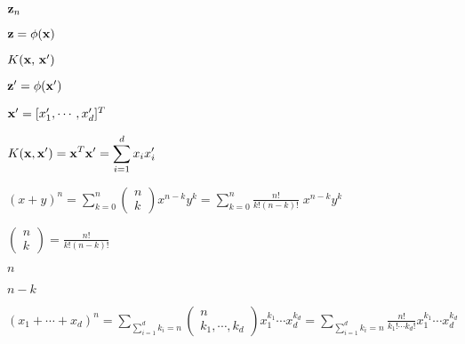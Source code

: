 \documentclass{article}
\def\lthtmlcheckvsize{\ifdim\ht\sizebox<\vsize 
  \ifdim\wd\sizebox<\hsize\expandafter\hfill\fi \expandafter\vfill
  \else\expandafter\vss\fi}%
\begin{document}
{\newpage\clearpage
{}%
$ {\bf z}_n$%
\lthtmlindisplaymathZ
\lthtmlcheckvsize\clearpage}

{\newpage\clearpage
{}%
$ {\bf z}=\phi({\bf x})$%
\lthtmlindisplaymathZ
\lthtmlcheckvsize\clearpage}

{\newpage\clearpage
{}%
$ K({\bf x},\,{\bf x}')$%
\lthtmlindisplaymathZ
\lthtmlcheckvsize\clearpage}

{\newpage\clearpage
{}%
$ {\bf z}'=\phi({\bf x}')$%
\lthtmlindisplaymathZ
\lthtmlcheckvsize\clearpage}

{\newpage\clearpage
{}%
$ {\bf x}'=[x'_1,\cdots,x'_d]^T$%
\lthtmlindisplaymathZ
\lthtmlcheckvsize\clearpage}

{\newpage\clearpage
{}%
$\displaystyle K({\bf x},{\bf x}')={\bf x}^T {\bf x}'=\sum_{i=1}^d x_ix'_i$%
\lthtmlindisplaymathZ
\lthtmlcheckvsize\clearpage}

{\newpage\clearpage
{}%
$\displaystyle (x+y)^n=\sum_{k=0}^n\left(\begin{array}{c}n\\k\end{array}\right) x^{n-k} y^k
=\sum_{k=0}^n \frac{n!}{k!(n-k)!}\; x^{n-k} y^k$%
\lthtmlindisplaymathZ
\lthtmlcheckvsize\clearpage}

{\newpage\clearpage
{}%
$\displaystyle \left(\begin{array}{c}n\\k\end{array}\right)=\frac{n!}{k!(n-k)!}$%
\lthtmlindisplaymathZ
\lthtmlcheckvsize\clearpage}

{\newpage\clearpage
{}%
$ n$%
\lthtmlindisplaymathZ
\lthtmlcheckvsize\clearpage}

{\newpage\clearpage
{}%
$ n-k$%
\lthtmlindisplaymathZ
\lthtmlcheckvsize\clearpage}

{\newpage\clearpage
{}%
$\displaystyle (x_1+\cdots+x_d)^n=\sum_{\sum_{i=1}^d k_i=n}
\left(\begin{array}{c}n\\k_1,\cdots,k_d\end{array}\right)x_1^{k_1}\cdots x_d^{k_d}
=\sum_{\sum_{i=1}^d k_i=n}\frac{n!}{k_1!\cdots k_d!}x_1^{k_1}\cdots x_d^{k_d}$%
\lthtmlindisplaymathZ
\lthtmlcheckvsize\clearpage}
\end{document}
